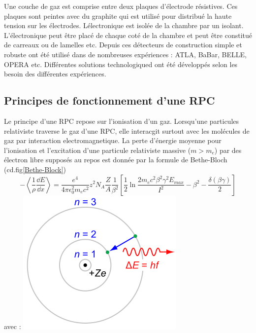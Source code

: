 Une couche de gaz est comprise entre deux plaques d'électrode résistives. Ces plaques sont peintes avec du graphite qui est utilisé pour distribué la haute tension sur les électrodes. Lélectronique est isolée de la chambre par un isolant. L'électronique peut être placé de chaque coté de la chambre et peut être constitué de carreaux ou de lamelles etc.
Depuis ces détecteurs de construction simple et robuste ont été utilisé dans de nombreuses expériences : ATLA, BaBar, BELLE, OPERA etc. Différentes solutions technologiqued ont été développés selon les besoin des différentes expériences.

\subsection{Principes de fonctionnement d'une RPC}
Le principe d'une RPC repose sur l'ionisation d'un gaz. Lorsqu'une particules relativiste traverse le gaz d'une RPC, elle interacgit surtout avec les molécules de gaz par interaction electromagnetique. La perte d'énergie moyenne pour l'ionisation et l'excitation d'une particule relativiste massive ($m>m_{e}$) par des électron libre supposés au repos est donnée par la formule de Bethe-Bloch (cd.fig\ref{Bethe-Block})
\begin{equation}
-\left<\frac{1}{\rho}\frac{\dd E}{\dd x}\right>=\frac{e^{4}}{4\pi \epsilon_{0}^{2}m_{e}c^{2}}z^{2}N_{A}\frac{Z}{A}\frac{1}{\beta^{2}}\left[\frac{1}{2}\ln\frac{2m_{e}c^{2}\beta^{2}\gamma^{2}E_{max}}{I^{2}}-\beta^{2}-\frac{\delta(\beta\gamma)}{2}\right]
\end{equation}
avec :
	\marginpar
{
	\centering
	\includegraphics[width=\marginparwidth]{RPC/Photon.png}
	\label{photon}
}
\marginpar

